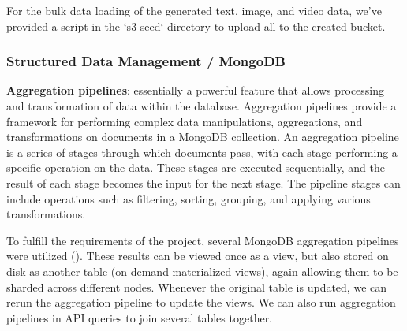 \documentclass{report}
\begin{document}
    For the bulk data loading of the generated text, image, and video data, we've provided a script in the `s3-seed` directory to upload all to the created bucket.

    \subsubsection{Structured Data Management / MongoDB}
    \textbf{Aggregation pipelines}: essentially a powerful feature that allows processing and transformation of data within the database. Aggregation pipelines provide a framework for performing complex data manipulations, aggregations, and transformations on documents in a MongoDB collection. An aggregation pipeline is a series of stages through which documents pass, with each stage performing a specific operation on the data. These stages are executed sequentially, and the result of each stage becomes the input for the next stage. The pipeline stages can include operations such as filtering, sorting, grouping, and applying various transformations.

    To fulfill the requirements of the project, several MongoDB aggregation pipelines were utilized (). These results can be viewed once as a view, but also stored on disk as another table (on-demand materialized views), again allowing them to be sharded across different nodes. Whenever the original table is updated, we can rerun the aggregation pipeline to update the views. We can also run aggregation pipelines in API queries to join several tables together.
\end{document}

